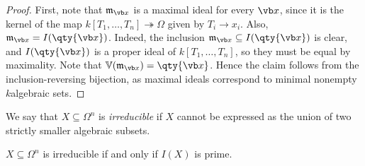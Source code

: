 \begin{proof}
    First, note that \( \mathfrak m_{\vb x} \) is a maximal ideal for every \( \vb x \), since it is the kernel of the map \( k[T_1, \dots, T_n] \twoheadrightarrow \Omega \) given by \( T_i \to x_i \).
    Also, \( \mathfrak m_{\vb x} = I(\qty{\vb x}) \).
    Indeed, the inclusion \( \mathfrak m_{\vb x} \subseteq I(\qty{\vb x}) \) is clear, and \( I(\qty{\vb x}) \) is a proper ideal of \( k[T_1, \dots, T_n] \), so they must be equal by maximality.
    Note that \( \mathbb V(\mathfrak m_{\vb x}) = \qty{\vb x} \).
    Hence the claim follows from the inclusion-reversing bijection, as maximal ideals correspond to minimal nonempty \( k \)algebraic sets.
\end{proof}
\begin{definition}
    We say that \( X \subseteq \Omega^n \) is \emph{irreducible} if \( X \) cannot be expressed as the union of two strictly smaller algebraic subsets.
\end{definition}
\begin{proposition}
    \( X \subseteq \Omega^n \) is irreducible if and only if \( I(X) \) is prime.
\end{proposition}

